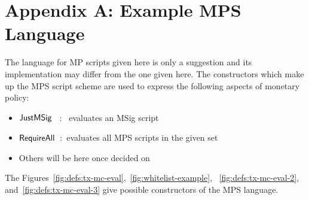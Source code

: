 \section*{Appendix A: Example MPS Language}
\label{sec:mps-lang}

 The language for MP scripts given here is only a suggestion and its
implementation may differ from the one given here. The constructors which make
up the MPS script scheme are used to express the following
aspects of monetary policy:

\begin{itemize}
\item $\mathsf{JustMSig}$~ :~ evaluates an MSig script

\item $\mathsf{RequireAll}$~:~evaluates all MPS scripts in the given set

\item Others will be here once decided on
\end{itemize}

The Figures~\ref{fig:defs:tx-mc-eval},~\ref{fig:whitelist-example},
~\ref{fig:defs:tx-mc-eval-2}, and~\ref{fig:defs:tx-mc-eval-3} give
possible constructors of the MPS language.


